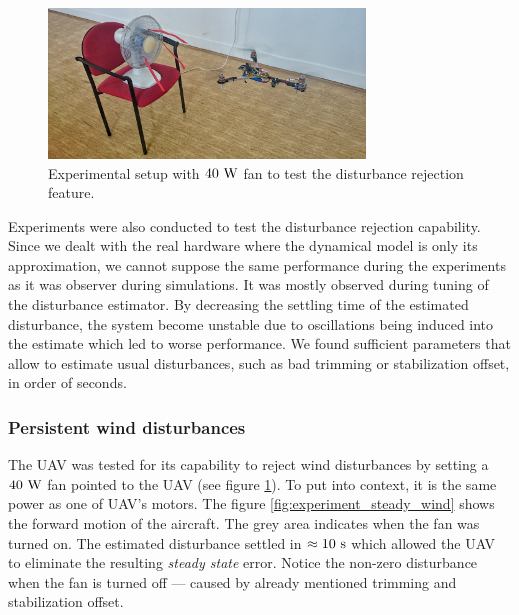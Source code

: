 \begin{figure}[b]
\centering
\includegraphics[width=0.75\textwidth]{fig/disturbance.jpg}
\caption{Experimental setup with $40~\mathrm{W}$ fan to test the disturbance rejection feature.}
\label{fig:vetrak1}
\end{figure}

Experiments were also conducted to test the disturbance rejection capability. Since we dealt with the real hardware where the dynamical model is only its approximation, we cannot suppose the same performance during the experiments as it was observer during simulations. It was mostly observed during tuning of the disturbance estimator. By decreasing the settling time of the estimated disturbance, the system become unstable due to oscillations being induced into the estimate which led to worse performance. We found sufficient parameters that allow to estimate usual disturbances, such as bad trimming or stabilization offset, in order of seconds.
 
\subsubsection{Persistent wind disturbances}
\label{cap:persistant_wind_disturbances_experiment}

The UAV was tested for its capability to reject wind disturbances by setting a $40~\mathrm{W}$ fan pointed to the UAV (see figure \ref{fig:vetrak1}). To put into context, it is the same power as one of UAV's motors. The figure \ref{fig:experiment_steady_wind} shows the forward motion of the aircraft. The grey area indicates when the fan was turned on. The estimated disturbance settled in $\approx 10~\mathrm{s}$ which allowed the UAV to eliminate the resulting \emph{steady state} error. Notice the non-zero disturbance when the fan is turned off --- caused by already mentioned trimming and stabilization offset.

